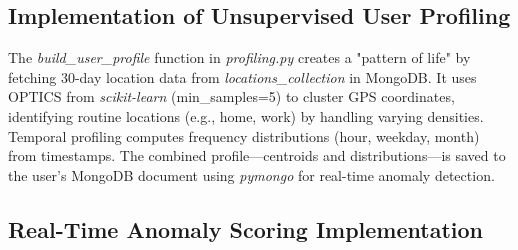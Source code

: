 \documentclass[12pt,a4paper,oneside,english]{book}
\begin{document}
 \subsection{Implementation of Unsupervised User Profiling}
\label{sec:unsupervised_implementation}
The \textit{build\_user\_profile} function in \textit{profiling.py} creates a "pattern of life" by fetching 30-day location data from \textit{locations\_collection} in MongoDB. 
It uses OPTICS from \textit{scikit-learn} (min\_samples=5) to cluster GPS coordinates, identifying routine locations (e.g., home, work) by handling varying densities. 
Temporal profiling computes frequency distributions (hour, weekday, month) from timestamps. 
The combined profile—centroids and distributions—is saved to the user's MongoDB document using \textit{pymongo} for real-time anomaly detection.


\subsection{Real-Time Anomaly Scoring Implementation}
\label{sec:anomaly_scoring_impl}
\end{document}
